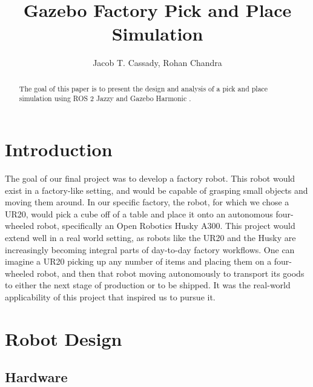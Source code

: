 \documentclass[journal]{new-aiaa}
\title{Gazebo Factory Pick and Place Simulation}
\author{Jacob T. Cassady, Rohan Chandra}
\affil{Johns Hopkins University, Whiting School of Engineering, Baltimore, MD, 21206}
\begin{document}
\maketitle
\begin{abstract}
    The goal of this paper is to present the design and analysis of a pick and place simulation using ROS 2 Jazzy \cite{doi:10.1126/scirobotics.abm6074} and Gazebo Harmonic \cite{Gazebo}.
\end{abstract}

\section{Introduction}\label{sec:Introduction}
The goal of our final project was to develop a factory robot. 
This robot would exist in a factory-like setting, and would be capable of grasping small objects and moving them around. 
In our specific factory, the robot, for which we chose a UR20, would pick a cube off of a table and place it onto an autonomous four-wheeled robot, specifically an Open Robotics Husky A300. 
This project would extend well in a real world setting, as robots like the UR20 and the Husky are increasingly becoming integral parts of day-to-day factory workflows. 
One can imagine a UR20 picking up any number of items and placing them on a four-wheeled robot, and then that robot moving autonomously to transport its goods to either the next stage of production or to be shipped. 
It was the real-world applicability of this project that inspired us to pursue it.

\cite{DBLP:journals/corr/ColemanSCC14}

\section{Robot Design}\label{sec:Robot Design}

\subsection{Hardware}\label{sec:Robot Design:Hardware}
\end{document}
